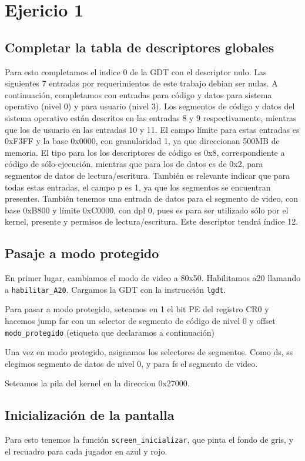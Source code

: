 \section{Ejericio 1}

\subsection{Completar la tabla de descriptores globales}
Para esto completamos el indice 0 de la GDT con el descriptor nulo. Las siguientes 7 entradas por requerimientos de este trabajo debian ser nulas.
A continuación, completamos con entradas para código y datos para sistema operativo (nivel 0) y para usuario (nivel 3). Los segmentos de código y datos del sistema operativo están descritos en las entradas 8 y 9 respectivamente, mientras que los de usuario en las entradas 10 y 11. 
El campo límite para estas entradas es 0xF3FF y la base 0x0000, con granularidad 1, ya que direccionan  500MB de memoria. El tipo para los los descriptores de código es 0x8, correspondiente a código de sólo-ejecución, mientras que para los de datos es de 0x2, para segmentos de datos de lectura/escritura. También es relevante indicar que para todas estas entradas, el campo p es 1, ya que los segmentos se encuentran presentes.
También tenemos una entrada de datos para el segmento de video, con base 0xB800 y límite 0xC0000, con dpl 0, pues es para ser utilizado sólo por el kernel, presente y permisos de lectura/escritura. Este descriptor tendrá índice 12. 

\subsection{Pasaje a modo protegido}
En primer lugar, cambiamos el modo de video a 80x50.
Habilitamos a20 llamando a \texttt{habilitar\_A20}.
Cargamos la GDT  con la instrucción \texttt{lgdt}.

Para pasar a modo protegido, seteamos en 1 el bit PE del registro CR0 y hacemos jump far con un selector de segmento de código de nivel 0 y offset \texttt{modo\_protegido} (etiqueta que declaramos a continuación)

Una vez en modo protegido, asignamos los selectores de segmentos. Como ds, ss elegimos segmento de datos de nivel 0, y para fs el segmento de video.

Seteamos la pila del kernel en la direccion 0x27000.

\subsection{Inicialización de la pantalla}

Para esto tenemos la función \texttt{screen\_inicializar}, que pinta el fondo de gris, y el recuadro para cada jugador en azul y rojo.
